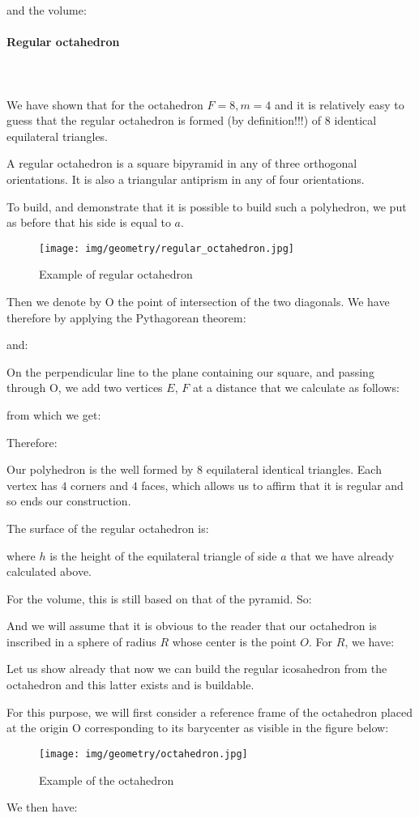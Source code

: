 {	and the volume:
	
	
	\paragraph{Regular octahedron}\mbox{}\\\\
	We have shown that for the octahedron $F=8,m=4$ and it is relatively easy to guess that the regular octahedron is formed (by definition!!!) of $8$ identical equilateral triangles.
	
	 A regular octahedron is a square bipyramid in any of three orthogonal orientations. It is also a triangular antiprism in any of four orientations.
	
	To build, and demonstrate that it is possible to build such a polyhedron, we put as before that his side is equal to $a$.
	\begin{figure}[H]
		\centering
		\texttt{[image: img/geometry/regular\_octahedron.jpg]}
		\caption{Example of regular octahedron }
	\end{figure}
	Then we denote by O the point of intersection of the two diagonals. We have therefore by applying the Pythagorean theorem:
	
	and:
	
	On the perpendicular line to the plane containing our square, and passing through O, we add two vertices $E$, $F$ at a distance that we calculate as follows:
	
	from which we get:
	
	Therefore:
	
	Our polyhedron is the well formed by $8$ equilateral identical triangles. Each vertex has $4$ corners and $4$ faces, which allows us to affirm that it is regular and so ends our construction.
	
	The surface of the regular octahedron is:
	
	where $h$ is the height of the equilateral triangle of side $a$ that we have already calculated above. 

	For the volume, this is still based on that of the pyramid. So:
	
	And we will assume that it is obvious to the reader that our octahedron is inscribed in a sphere of radius $R$ whose center is the point $O$. For $R$, we have:
	
	Let us show already that now we can build the regular icosahedron from the octahedron and this latter exists and is buildable.

	For this purpose, we will first consider a reference frame of the octahedron placed at the origin O corresponding to its barycenter as visible in the figure below:
	\begin{figure}[H]
		\centering
		\texttt{[image: img/geometry/octahedron.jpg]}
		\caption{Example of the octahedron}
	\end{figure}
	We then have:
	
}
